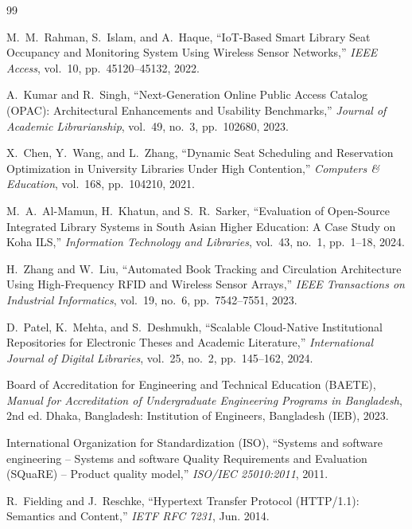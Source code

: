 \cleardoublepage
{}
\begin{thebibliography}{99}

M.~M.~Rahman, S.~Islam, and A.~Haque, ``IoT-Based Smart Library Seat Occupancy and Monitoring System Using Wireless Sensor Networks,'' \textit{IEEE Access}, vol.~10, pp.~45120--45132, 2022.

A.~Kumar and R.~Singh, ``Next-Generation Online Public Access Catalog (OPAC): Architectural Enhancements and Usability Benchmarks,'' \textit{Journal of Academic Librarianship}, vol.~49, no.~3, pp.~102680, 2023.

X.~Chen, Y.~Wang, and L.~Zhang, ``Dynamic Seat Scheduling and Reservation Optimization in University Libraries Under High Contention,'' \textit{Computers \& Education}, vol.~168, pp.~104210, 2021.

M.~A.~Al-Mamun, H.~Khatun, and S.~R.~Sarker, ``Evaluation of Open-Source Integrated Library Systems in South Asian Higher Education: A Case Study on Koha ILS,'' \textit{Information Technology and Libraries}, vol.~43, no.~1, pp.~1--18, 2024.

H.~Zhang and W.~Liu, ``Automated Book Tracking and Circulation Architecture Using High-Frequency RFID and Wireless Sensor Arrays,'' \textit{IEEE Transactions on Industrial Informatics}, vol.~19, no.~6, pp.~7542--7551, 2023.

D.~Patel, K.~Mehta, and S.~Deshmukh, ``Scalable Cloud-Native Institutional Repositories for Electronic Theses and Academic Literature,'' \textit{International Journal of Digital Libraries}, vol.~25, no.~2, pp.~145--162, 2024.

Board of Accreditation for Engineering and Technical Education (BAETE), \textit{Manual for Accreditation of Undergraduate Engineering Programs in Bangladesh}, 2nd ed. Dhaka, Bangladesh: Institution of Engineers, Bangladesh (IEB), 2023.

International Organization for Standardization (ISO), ``Systems and software engineering -- Systems and software Quality Requirements and Evaluation (SQuaRE) -- Product quality model,'' \textit{ISO/IEC 25010:2011}, 2011.

R.~Fielding and J.~Reschke, ``Hypertext Transfer Protocol (HTTP/1.1): Semantics and Content,'' \textit{IETF RFC 7231}, Jun. 2014.


\end{thebibliography}
